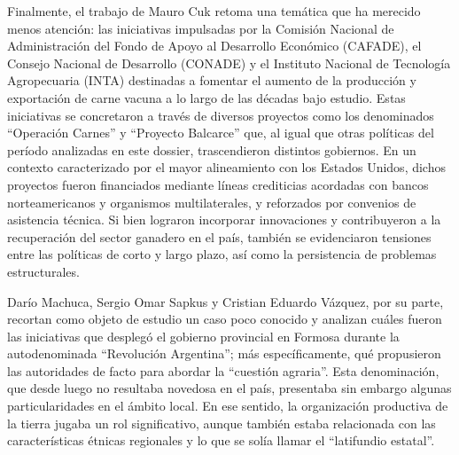 Finalmente, el trabajo de Mauro Cuk retoma una temática que ha merecido menos atención: las iniciativas impulsadas por la Comisión Nacional de Administración del Fondo de Apoyo al Desarrollo Económico (CAFADE), el Consejo Nacional de Desarrollo (CONADE) y el Instituto Nacional de Tecnología Agropecuaria (INTA) destinadas a fomentar el aumento de la producción y exportación de carne vacuna a lo largo de las décadas bajo estudio. Estas iniciativas se concretaron a través de diversos proyectos como los denominados “Operación Carnes” y “Proyecto Balcarce” que, al igual que otras políticas del período analizadas en este dossier, trascendieron distintos gobiernos. En un contexto caracterizado por el mayor alineamiento con los Estados Unidos, dichos proyectos fueron financiados mediante líneas crediticias acordadas con bancos norteamericanos y organismos multilaterales, y reforzados por convenios de asistencia técnica. Si bien lograron incorporar innovaciones y contribuyeron a la recuperación del sector ganadero en el país, también se evidenciaron tensiones entre las políticas de corto y largo plazo, así como la persistencia de problemas estructurales.

Darío Machuca, Sergio Omar Sapkus y Cristian Eduardo Vázquez, por su parte, recortan como objeto de estudio un caso poco conocido y analizan cuáles fueron las iniciativas que desplegó el gobierno provincial en Formosa durante la autodenominada “Revolución Argentina”; más específicamente, qué propusieron las autoridades de facto para abordar la “cuestión agraria”. Esta denominación, que desde luego no resultaba novedosa en el país, presentaba sin embargo algunas particularidades en el ámbito local. En ese sentido, la organización productiva de la tierra jugaba un rol significativo, aunque también estaba relacionada con las características étnicas regionales y lo que se solía llamar el “latifundio estatal”.


